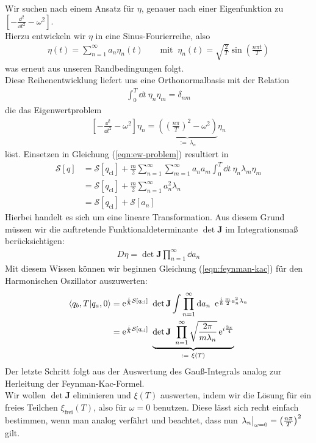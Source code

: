 	Wir suchen nach einem Ansatz für $\eta$, genauer nach einer Eigenfunktion zu $\left[-\frac{\dd^2}{\dd t^2}-\omega^2\right]$. \\
	Hierzu entwickeln wir $\eta$ in eine Sinus-Fourierreihe, also
	\begin{align}
		\eta(t) = \sum_{n=1}^{\infty} a_n\eta_n(t) \qquad \text{mit } \ \eta_n(t) = \sqrt{\frac{2}{T}}\sin\left(\frac{n\pi t}{T}\right)
	\end{align}
was erneut aus unseren Randbedingungen folgt. \\ 
Diese Reihenentwicklung liefert uns eine Orthonormalbasis mit der Relation 
\begin{align}
	\int_0^T \dd t \ \eta_n \eta_m = \delta_{nm}
\end{align}
die das Eigenwertproblem
\begin{align}
	\left[-\frac{\dd^2}{\dd t^2}-\omega^2\right]\eta_n = \underbrace{\left(\left(\frac{n\pi}{T}\right)^2-\omega^2\right)}_{:= \ \lambda_n}\eta_n 
\end{align}
löst. Einsetzen in Gleichung (\ref{eqn:ew-problem}) resultiert in 
\begin{align}
\mathcal{S}[q] &= \mathcal{S}[q_{\text{cl}}] + \frac{m}{2}\sum_{n=1}^{\infty}\sum_{m=1}^{\infty}a_na_m \int_0^T \dd t \ \eta_n\lambda_m\eta_m \nonumber \\
&= \mathcal{S}[q_{\text{cl}}] + \frac{m}{2}\sum_{n=1}^{\infty}a_n^2\lambda_n \nonumber \\
&= \mathcal{S}[q_{\text{cl}}] + \mathcal{S}[a_n]
\end{align}
 Hierbei handelt es sich um eine lineare Transformation. Aus diesem Grund müssen wir die auftretende Funktionaldeterminante $\operatorname{det}\mathbf{J}$ im Integrationsmaß berücksichtigen:
 \begin{align*}
 	D\eta = \operatorname{det}\mathbf{J} \prod_{n=1}^{\infty} \dd a_n
 \end{align*}
 Mit diesem Wissen können wir beginnen Gleichung (\ref{eqn:feynman-kac}) für den Harmonischen Oszillator auszuwerten:
 \begin{align}
 	\braket{q_b,T}{q_a,0} &= \operatorname{e}^{\ihbar\mathcal{S}[q_{\text{cl}}]} \ \operatorname{det}\mathbf{J} \int \prod_{n=1}^{\infty} \dd a_n \  \operatorname{e}^{\ihbar\frac{m}{2} a_n^2 \lambda_n} \nonumber\\
 	&= \operatorname{e}^{\ihbar\mathcal{S}[q_{\text{cl}}]} \ \underbrace{\operatorname{det}\mathbf{J} \  \prod_{n=1}^{\infty} \sqrt{\frac{2\pi}{m\lambda_n}} \operatorname{e}^{i\frac{3\pi}{4}}}_{:= \ \xi(T)}
 \end{align}
 Der letzte Schritt folgt aus der Auswertung des Gauß-Integrals analog zur Herleitung der Feynman-Kac-Formel. \\
 Wir wollen $\operatorname{det}\mathbf{J}$ eliminieren und $\xi(T)$ auswerten, indem wir die Lösung für ein freies Teilchen $\xi_{\text{frei}}(T)$, also für $\omega = 0$ benutzen. Diese lässt sich recht einfach bestimmen, wenn man analog verfährt und beachtet, dass nun $\eval{\lambda_n}_{\omega = 0} = \left(\frac{n\pi}{T}\right)^2$ gilt. \\
 
